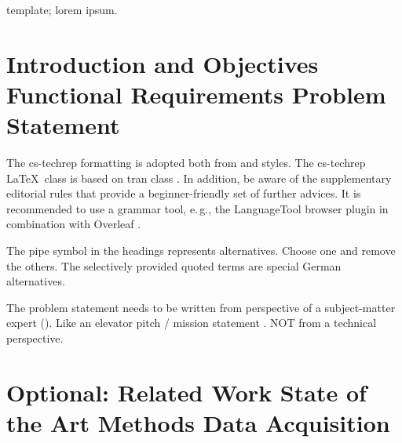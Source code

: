 \documentclass[conference,a4paper,flushend]{cs-techrep}
\begin{document}
\selectlanguage{\cstechrepLang}

\maketitle

\begin{abstract}
\lipsum[11]%
\{\,\faWarning{}The abstract does neither mention a teaching module nor a team/project,
it is a summary of the content of the technical report, thus, the objectives and architecture.\}
\end{abstract}

\begin{IEEEkeywords}
template; lorem ipsum.
\end{IEEEkeywords}

\section{Introduction and Objectives \textbar{} Functional Requirements \textbar{} Problem Statement}

The cs-techrep formatting is adopted both from  \cite{ieee2018formattingrules} and  \cite{iaria2014formattingrules} styles.
The cs-techrep \LaTeX\ class is based on tran class \cite{ieee2015howto}.
In addition, be aware of the supplementary  editorial rules \cite{iaria2009editorialrules} \faWarning{} that provide a beginner-friendly set of further advices.
It is recommended to use a grammar tool, e.\,g., the LanguageTool \cite{languagetool} browser plugin in combination with Overleaf \cite{overleaf}.

The pipe symbol \textquote{\textbar{}} in the headings represents alternatives. Choose one and remove the others. The selectively provided quoted terms are special German alternatives.

The problem statement needs to be written from perspective of a subject-matter expert (). Like an elevator pitch / mission statement \faWarning{}. NOT from a technical perspective.

\section{Optional: Related Work \textbar{} State of the Art \textbar{} Methods \textbar{} Data Acquisition}
\lipsum[12]
\end{document}
